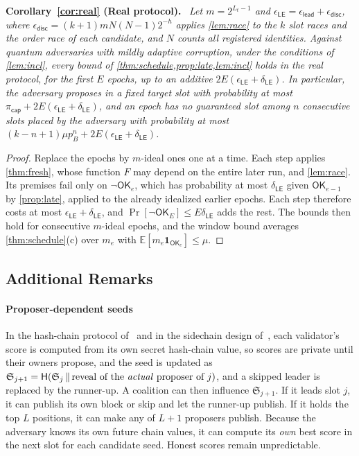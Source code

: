 \documentclass[10pt,journal,compsoc]{IEEEtran}
\theoremstyle{tplain}
\theoremstyle{tdef}
\theoremstyle{remark}
\newcommand{\Hash}{\mathsf{H}}
\newcommand{\cS}{\mathfrak{S}}
\newenvironment{restate}[1]{\par\smallskip\noindent\textbf{#1.}\ \itshape\ignorespaces}{\par\smallskip}
\begin{document}
\begin{restate}{Corollary~\ref{cor:real} (Real protocol)}
Let $m=2^{L_t-1}$ and $\epsilon_{\mathsf{LE}}=\epsilon_{\mathsf{lead}}+\epsilon_{\mathsf{disc}}$, where $\epsilon_{\mathsf{disc}}=(k+1)mN(N-1)2^{-h}$ applies \cref{lem:race} to the $k$ slot races and the order race of each candidate, and $N$ counts all registered identities. Against quantum adversaries with mildly adaptive corruption, under the conditions of \cref{lem:incl}, every bound of \cref{thm:schedule,prop:late,lem:incl} holds in the real protocol, for the first $E$ epochs, up to an additive $2E(\epsilon_{\mathsf{LE}}+\delta_{\mathsf{LE}})$. In particular, the adversary proposes in a fixed target slot with probability at most $\pi_{\mathsf{cap}}+2E(\epsilon_{\mathsf{LE}}+\delta_{\mathsf{LE}})$, and an epoch has no guaranteed slot among $n$ consecutive slots placed by the adversary with probability at most $(k-n+1)\mu p_B^{n}+2E(\epsilon_{\mathsf{LE}}+\delta_{\mathsf{LE}})$.
\end{restate}
\begin{proof}
Replace the epochs by $m$-ideal ones one at a time. Each step applies \cref{thm:fresh}, whose function $F$ may depend on the entire later run, and \cref{lem:race}. Its premises fail only on $\neg\mathsf{OK}_e$, which has probability at most $\delta_{\mathsf{LE}}$ given $\mathsf{OK}_{e-1}$ by \cref{prop:late}, applied to the already idealized earlier epochs. Each step therefore costs at most $\epsilon_{\mathsf{LE}}+\delta_{\mathsf{LE}}$, and $\Pr[\neg\mathsf{OK}_E]\le E\delta_{\mathsf{LE}}$ adds the rest. The bounds then hold for consecutive $m$-ideal epochs, and the window bound averages \cref{thm:schedule}(c) over $m_e$ with $\mathbb E[m_e\mathbf 1_{\mathsf{OK}_e}]\le\mu$.
\end{proof}

\subsection{Additional Remarks}\label{S-cons-remarks}

\paragraph{Proposer-dependent seeds} In the hash-chain protocol of~\cite{QRL} and in the sidechain design of~\cite{myeprint}, each validator's score is computed from its own secret hash-chain value, so scores are private until their owners propose, and the seed is updated as $\cS_{j+1}=\Hash(\cS_j\,\|\,\text{reveal of the \emph{actual} proposer of }j)$, and a skipped leader is replaced by the runner-up. A coalition can then influence $\cS_{j+1}$. If it leads slot $j$, it can publish its own block or skip and let the runner-up publish. If it holds the top $L$ positions, it can make any of $L+1$ proposers publish. Because the adversary knows its own future chain values, it can compute its \emph{own} best score in the next slot for each candidate seed. Honest scores remain unpredictable.
\end{document}
